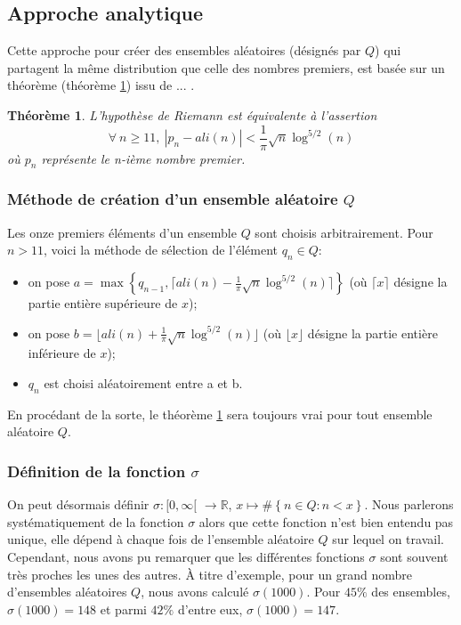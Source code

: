 \documentclass[../main.tex]{report}
\begin{document}
\theoremstyle{plain}
\newtheorem{Thm}{Théorème}

\subsection{Approche analytique}

Cette approche pour créer des ensembles aléatoires (désignés par $Q$) qui partagent la même distribution que celle des nombres
premiers, est basée sur un théorème (théorème \ref{theorem}) issu de ... . 

\begin{Thm}
\label{theorem}
	L'hypothèse de Riemann est équivalente à l'assertion 
	\[
	\forall \ n \geqslant 11, \ |p_{n} - ali(n) | < \frac{1}{\pi} \sqrt{n} \log^{5/2}(n) 
	\]
	où $p_{n}$ représente le n-ième nombre premier.
\end{Thm}

\subsubsection{Méthode de création d'un ensemble aléatoire $Q$}

Les onze premiers éléments d'un ensemble $Q$ sont choisis arbitrairement. 
Pour $ n > 11 $, voici la méthode de sélection  de l'élément $q_{n} \in Q$: 
\begin{itemize}
	\item on pose $ a = \max \left\{ q_{n-1} ,\lceil{ali(n) - \frac{1}{\pi} \sqrt{n} \log^{5/2}(n) \rceil} \right\}$ 
	(où $\lceil x \rceil$ désigne la partie entière supérieure de $x$);
	\item on pose $ b = \lfloor ali(n) + \frac{1}{\pi} \sqrt{n} \log^{5/2}(n) \rfloor $
	(où $\lfloor x \rfloor$ désigne la partie entière inférieure de $x$);
	\item $ q_{n} $ est choisi aléatoirement entre a et b. 
\end{itemize}
En procédant de la sorte, le théorème \ref{theorem} sera toujours vrai pour tout ensemble aléatoire $Q$.

\subsubsection{Définition de la fonction $\sigma$}

On peut désormais définir $ \sigma : [0, \infty [$  $\rightarrow \mathbb{R} $, $ x \mapsto \# \left\{ n \in Q : n < x \right\} $. Nous parlerons systématiquement de  la fonction $\sigma$ alors que cette fonction n'est bien entendu pas unique, elle dépend à chaque fois de l'ensemble aléatoire $Q$ sur lequel on travail. Cependant, nous avons pu remarquer que  les différentes fonctions $\sigma$ sont souvent très proches les unes des autres. À titre d'exemple,  pour un grand nombre d'ensembles aléatoires $Q$, nous avons calculé $\sigma(1000)$. Pour $45 \%$ des ensembles, $\sigma(1000) = 148$ et parmi $42\%$ d'entre eux, $\sigma(1000) = 147$.
\end{document}
